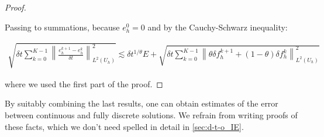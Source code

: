 \documentclass[english,a4paper,10pt,oneside]{scrbook}	%
\theoremstyle{break}
\newenvironment{mproof}[1][\proofname]{%
  \begin{proof}[#1]$ $\par\nobreak\ignorespaces
}{%
  \end{proof}
}
\renewcommand*{\proofname}{Proof}
\theoremstyle{remark}
\newcommand{\norm}[1]{\left\lVert#1\right\rVert}
\newcommand{\te}{\theta}
\begin{document}
\begin{appendices}
\begin{mproof}
Passing to summations, because $e_h^0=0$ and by the Cauchy-Schwarz inequality:

%

\begin{align*}
\sqrt{\delta t \sum_{k=0}^{K-1} \norm{\frac{e_{h}^{k+1}-e_h^k}{\delta t}}_{L^2(U_h)}^2}  \lesssim \delta t^{1/\te} E + \sqrt{\delta t \sum_{k=0}^{K-1}\norm{\theta \delta f_h^{k+1}+(1-\theta)\delta f_h^k}_{L^2(U_h)}^2}
\end{align*}

where we used the first part of the proof.
%
%
%
%
%
%
\end{mproof}

By suitably combining the last results, one can obtain estimates of the error between continuous and fully discrete solutions. We refrain from writing proofs of these facts, which we don't need spelled in detail in \cref{sec:d-t-o_IE}.

\end{appendices}

\newpage


\printbibliography[title={Bibliography}]

\end{document}
